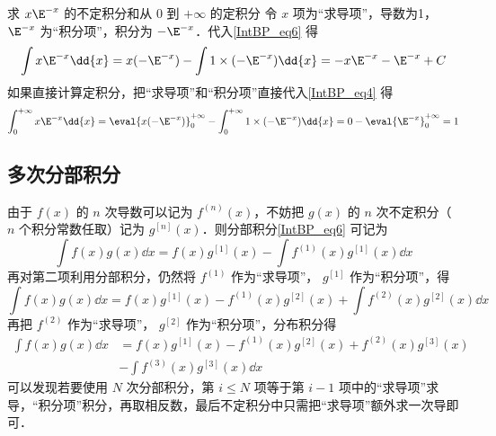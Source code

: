\begin{example}{求 $x \E^{ - x}$ 的不定积分和从 $0$ 到 $+\infty$ 的定积分}
令 $x$ 项为“求导项”，导数为1， $\E^{ - x}$ 为“积分项”，积分为 $-\E^{ - x}$．代入\autoref{IntBP_eq6} 得
\begin{equation}
\int x \E^{ - x} \dd{x}  = x(-\E^{ - x}) - \int 1 \times (-\E^{ - x}) \dd{x}  =  - x \E^{ - x} - \E^{ - x} + C
\end{equation}
如果直接计算定积分，把“求导项”和“积分项”直接代入\autoref{IntBP_eq4} 得
\begin{equation}
\int_0^{+\infty} x \E^{-x} \dd{x}  = \eval{ x( - \E^{-x}) }_0^{ + \infty } - \int_0^{+\infty} 1 \times (-\E^{-x}) \dd{x}  = 0 - \eval{ \E^{-x} }_0^{+\infty} = 1
\end{equation}
\end{example}

\subsection{多次分部积分}
由于 $f(x)$ 的 $n$ 次导数可以记为 $f^{(n)}(x)$，不妨把 $g(x)$ 的 $n$ 次不定积分（ $n$ 个积分常数任取）记为 $g^{[n]}(x)$．则分部积分\autoref{IntBP_eq6} 可记为
\begin{equation}
\int f(x)g(x) \dd{x}  = f(x) g^{[1]}(x) - \int f^{(1)}(x) g^{[1]}(x) \dd{x}
\end{equation}
再对第二项利用分部积分，仍然将 $f^{(1)}$ 作为“求导项”， $g^{[1]}$ 作为“积分项”，得
\begin{equation}
\int f(x)g(x) \dd{x}  = f(x) g^{[1]}(x) - f^{(1)}(x) g^{[2]}(x) + \int f^{(2)}(x) g^{[2]}(x) \dd{x}
\end{equation}
再把 $f^{(2)}$ 作为“求导项”， $g^{[2]}$ 作为“积分项”，分布积分得
\begin{equation}
\begin{aligned}
\int f(x)g(x) \dd{x} &= f(x) g^{[1]}(x) - f^{(1)}(x) g^{[2]}(x) + f^{(2)}(x)g^{[3]}(x) \\
&- \int f^{(3)}(x) g^{[3]}(x) \dd{x}
\end{aligned}
\end{equation}
可以发现若要使用 $N$ 次分部积分，第 $i \leqslant N$ 项等于第 $i-1$ 项中的“求导项”求导，“积分项”积分，再取相反数，最后不定积分中只需把“求导项”额外求一次导即可． 

